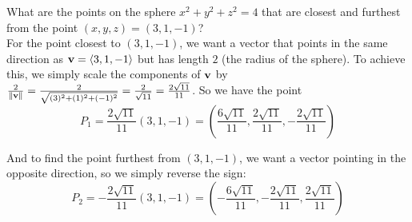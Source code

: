 \begin{example}\label{ex:sphere-closest-furthest-vector}
       What are the points on the sphere \( x^{2}+ y^{2}+ z^{2}=4 \) that are closest and furthest from the point \( (x,y,z) = (3,1, -1) \)? \\
       
       For the point closest to \( (3,1,-1) \), we want a vector that points in the same direction as \( \vb{v} = \left< 3,1,-1 \right>\) but has length \( 2 \) (the radius of the sphere). To achieve this, we simply scale the components of \( \vb{v}\) by \( \frac{2}{\norm{\vb{v}}} = \frac{2}{\sqrt{(3)^{2}+ (1)^{2} + (-1)^{2}}} = \frac{2}{\sqrt{11}} = \frac{2 \sqrt{11}}{11}\). So we have the point 
       \[ P_{1} =  \frac{2 \sqrt{11}}{11} \left( 3,1,-1 \right) = \boxed{\left( \frac{6\sqrt{11}}{11}, \frac{2\sqrt{11}}{11}, -\frac{2\sqrt{11}}{11} \right)}  \]
       
       And to find the point furthest from \( (3,1,-1) \), we want a vector pointing in the opposite direction, so we simply reverse the sign:
       \[ P_{2} = -\frac{2 \sqrt{11}}{11} \left( 3,1,-1 \right) = \boxed{\left( -\frac{6\sqrt{11}}{11}, -\frac{2\sqrt{11}}{11}, \frac{2\sqrt{11}}{11} \right)} \]
\end{example}
